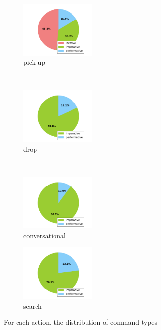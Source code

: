 \documentclass{article}[12pt]
\begin{document}
	\begin{figure}[h!]
		\begin{subfigure}[t]{0.3\textwidth}
			        \centering
	         \includegraphics[height=1.1in]{pickup_command_distribution.png}
	         \caption{pick up}
        \end{subfigure}%
		~ 
		\begin{subfigure}[t]{0.3\textwidth}
			\centering
			\includegraphics[height=1.1in]{drop_command_distribution.png}
			\caption{drop}
		\end{subfigure}%
		~
		\begin{subfigure}[t]{0.3\textwidth}
				\centering
					\includegraphics[height=1.1in]{convo_command_distribution.png}
				\caption{conversational}
		\end{subfigure}%
			\begin{subfigure}[t]{0.3\textwidth}
		\centering
		\includegraphics[height=1.1in]{search_command_distribution.png}
		\caption{search}
	\end{subfigure}%
\caption{For each action, the distribution of command types}
	\end{figure}
	
\end{document}
